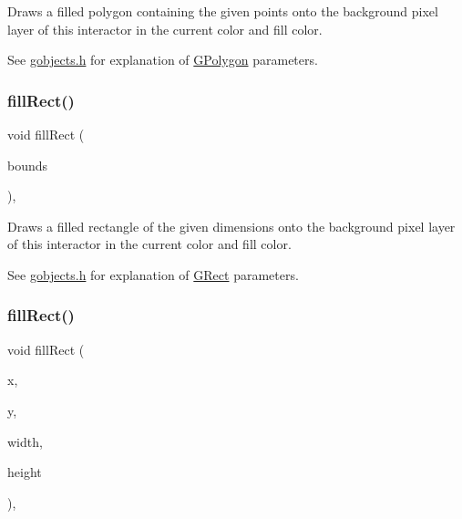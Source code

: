 Draws a filled polygon containing the given points onto the background pixel layer of this interactor in the current color and fill color. 

See \mbox{\hyperlink{gobjects_8h_source}{gobjects.\+h}} for explanation of \mbox{\hyperlink{classGPolygon}{G\+Polygon}} parameters. \mbox{\label{classGDrawingSurface_ae6582295003bf2488836b1993dadbad7}} 
\subsubsection{\texorpdfstring{fill\+Rect()}{fillRect()}\hspace{0.1cm}{\footnotesize\ttfamily [1/2]}}
{\footnotesize\ttfamily void fill\+Rect (\begin{DoxyParamCaption}\item[{const \mbox{\hyperlink{classGRectangle}{G\+Rectangle}} \&}]{bounds }\end{DoxyParamCaption})\hspace{0.3cm}{\ttfamily [virtual]}, {\ttfamily [inherited]}}



Draws a filled rectangle of the given dimensions onto the background pixel layer of this interactor in the current color and fill color. 

See \mbox{\hyperlink{gobjects_8h_source}{gobjects.\+h}} for explanation of \mbox{\hyperlink{classGRect}{G\+Rect}} parameters. \mbox{\label{classGDrawingSurface_aac3ae7d3aee950de78eca0e108352254}} 
\subsubsection{\texorpdfstring{fill\+Rect()}{fillRect()}\hspace{0.1cm}{\footnotesize\ttfamily [2/2]}}
{\footnotesize\ttfamily void fill\+Rect (\begin{DoxyParamCaption}\item[{double}]{x,  }\item[{double}]{y,  }\item[{double}]{width,  }\item[{double}]{height }\end{DoxyParamCaption})\hspace{0.3cm}{\ttfamily [virtual]}, {\ttfamily [inherited]}}



